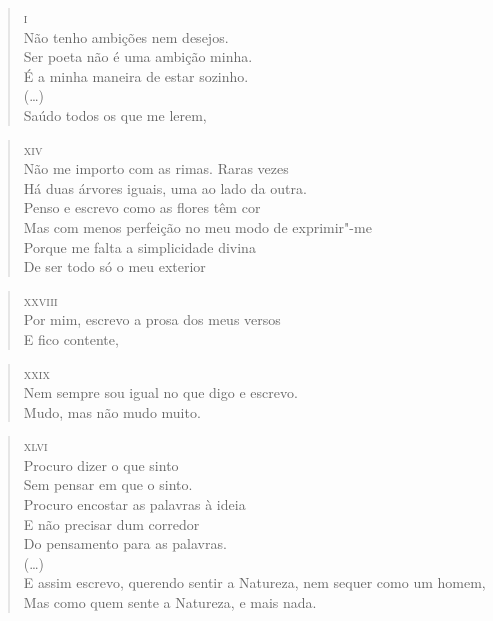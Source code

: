 \begin{verse}
\textsc{i}\\[5pt]
Não tenho ambições nem desejos.\\
Ser poeta não é uma ambição minha.\\
É a minha maneira de estar sozinho.\\
(\ldots{})\\
Saúdo todos os que me lerem,
\end{verse}

\begin{verse}
\textsc{xiv}\\[5pt]
Não me importo com as rimas. Raras vezes\\
Há duas árvores iguais, uma ao lado da \qb{}outra.\\
Penso e escrevo como as flores têm cor\\
Mas com menos perfeição no meu modo de \qb{}exprimir"-me\\
Porque me falta a simplicidade divina\\
De ser todo só o meu exterior
\end{verse}

\begin{verse}
\textsc{xxviii}\\[5pt]
Por mim, escrevo a prosa dos meus versos\\
E fico contente,
\end{verse}

\begin{verse}
\textsc{xxix}\\[5pt]
Nem sempre sou igual no que digo e escrevo.\\
Mudo, mas não mudo muito.
\end{verse}

\begin{verse}
\textsc{xlvi}\\[5pt]
Procuro dizer o que sinto\\
Sem pensar em que o sinto.\\
Procuro encostar as palavras à ideia\\
E não precisar dum corredor\\
Do pensamento para as palavras.\\
(\ldots{})\\
E assim escrevo, querendo sentir a Natureza, \qb{}nem sequer como um homem,\\
Mas como quem sente a Natureza, e mais \qb{}nada.
\end{verse}

